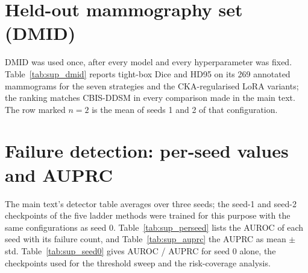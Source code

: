 \documentclass[runningheads]{llncs}
\begin{document}
\section{Held-out mammography set (DMID)}
\label{sup:dmid}

DMID was used once, after every model and every hyperparameter was fixed. Table~\ref{tab:sup_dmid} reports tight-box Dice and HD95 on its 269 annotated mammograms for the seven strategies and the CKA-regularised LoRA variants; the ranking matches CBIS-DDSM in every comparison made in the main text. The row marked $n=2$ is the mean of seeds 1 and 2 of that configuration.

\begin{table}[htbp]
  \centering
  \caption{DMID, tight boxes, 269 images. HD95 in pixels on the 1024 grid.}
  \label{tab:sup_dmid}
  
\end{table}

\section{Failure detection: per-seed values and AUPRC}
\label{sup:seeds}

The main text's detector table averages over three seeds; the seed-1 and seed-2 checkpoints of the five ladder methods were trained for this purpose with the same configurations as seed 0. Table~\ref{tab:sup_perseed} lists the AUROC of each seed with its failure count, and Table~\ref{tab:sup_auprc} the AUPRC as mean $\pm$ std. Table~\ref{tab:sup_seed0} gives AUROC / AUPRC for seed 0 alone, the checkpoints used for the threshold sweep and the risk-coverage analysis.

\begin{table}[htbp]
  \centering
  \caption{Per-seed AUROC at tight boxes and the number of failures (Dice below 0.5) per seed. Cells with fewer than 20 failures omitted.}
  \label{tab:sup_perseed}
  \resizebox{\linewidth}{!}{}
\end{table}

\begin{table}[htbp]
  \centering
  \caption{AUPRC at tight boxes, mean $\pm$ std over three seeds (single value: seed 0 only).}
  \label{tab:sup_auprc}
  \resizebox{\linewidth}{!}{}
\end{table}

\begin{table}[htbp]
  \centering
  \caption{Seed 0, tight boxes: AUROC / AUPRC for drift and the IoU estimate.}
  \label{tab:sup_seed0}
  \resizebox{\linewidth}{!}{}
\end{table}
\end{document}
